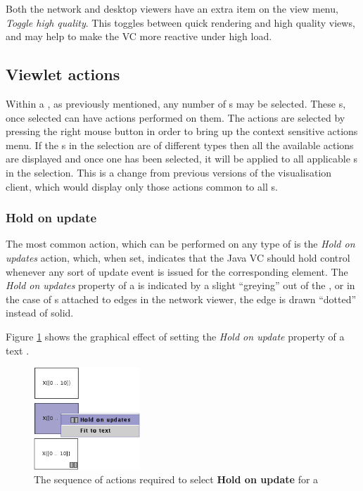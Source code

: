 Both the network and desktop viewers have an extra item on the view
menu, \emph{Toggle high quality}.  This toggles between quick
rendering and high quality views, and may help to make the VC more
reactive under high load.

\subsection{Viewlet actions}

Within a \viewer{}, as previously mentioned, any number of \viewlet{}s
may be selected.  These \viewlet{}s, once selected can have actions
performed on them.  The actions are selected by pressing the right
mouse button in order to bring up the context sensitive actions menu.
If the \viewlet{}s in the selection are of different types then all
the available actions are displayed and once one has been selected, it
will be applied to all applicable \viewlet{}s in the selection.  This
is a change from previous versions of the visualisation client, which
would display only those actions common to all \viewlet{}s.

\subsubsection{Hold on update}
The most common action, which can be performed on any type of
\viewlet{} is the \emph{Hold on updates} action, which, when set,
indicates that the Java VC should hold control whenever any sort of
update event is issued for the corresponding \viewable{} element.  The
\emph{Hold on updates} property of a \viewlet{} is indicated by a
slight ``greying'' out of the \viewlet{}, or in the case of
\viewlet{}s attached to edges in the network viewer, the edge is drawn
``dotted'' instead of solid.

Figure \ref{fig:viewlethold} shows the graphical effect of setting the
\emph{Hold on update} property of a text \viewlet.

\begin{figure}[htp]
\centering
\includegraphics[width=4cm]{vcviewlethold}
\caption{The sequence of actions required to select \textbf{Hold on update} for a \viewlet{}}
\label{fig:viewlethold}
\end{figure}

